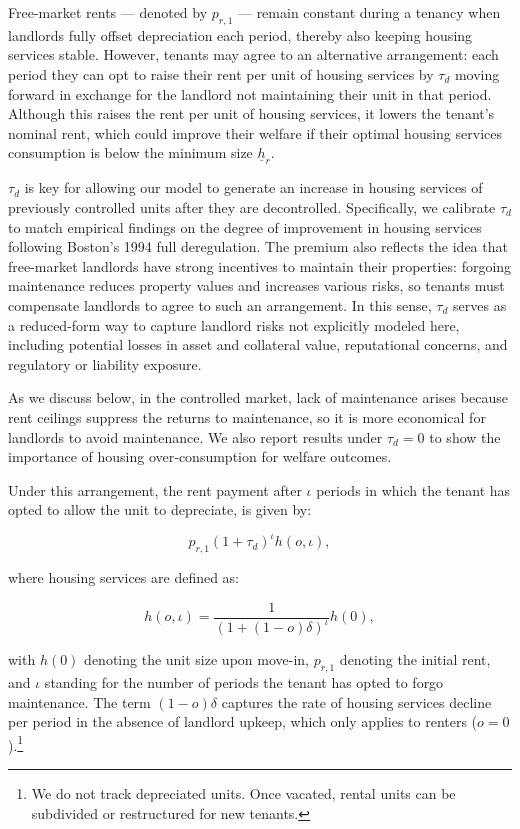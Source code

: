 \documentclass[parskip=full]{article}
\begin{document}
Free-market rents — denoted by $p_{r,1}$ — remain constant during a tenancy when landlords fully offset depreciation each period, thereby also keeping housing services stable. However, tenants may agree to an alternative arrangement: each period they can opt to raise their rent per unit of housing services by $\tau_d$ moving forward in exchange for the landlord not maintaining their unit in that period. Although this raises the rent per unit of housing services, it lowers the tenant’s nominal rent, which could improve their welfare if their optimal housing services consumption is below the minimum size $\underline{h}_r$. 

$\tau_d$ is key for allowing our model to generate an increase in housing services of previously controlled units after they are decontrolled. Specifically, we calibrate $\tau_d$ to match empirical findings on the degree of improvement in housing services following Boston's 1994 full deregulation. The premium also reflects the idea that free-market landlords have strong incentives to maintain their properties: forgoing maintenance reduces property values and increases various risks, so tenants must compensate landlords to agree to such an arrangement. In this sense, $\tau_d$ serves as a reduced-form way to capture landlord risks not explicitly modeled here, including potential losses in asset and collateral value, reputational concerns, and regulatory or liability exposure.

As we discuss below, in the controlled market, lack of maintenance arises because rent ceilings suppress the returns to maintenance, so it is more economical for landlords to avoid maintenance. We also report results under $\tau_d=0$ to show the importance of housing over‑consumption for welfare outcomes.

Under this arrangement, the rent payment after $\iota$ periods in which the tenant has opted to allow the unit to depreciate, is given by:

\begin{equation}\label{eq:rent_in_free_market}
p_{r,1}(1+\tau_d)^{\iota} h(o,\iota),
\end{equation}

\noindent where housing services are defined as:

\begin{equation}\label{eq:housing_services}
h(o,\iota) = \frac{1}{(1 + (1 - o)\delta)^{\iota}} h(0),
\end{equation}

\noindent with $h(0)$ denoting the unit size upon move-in, $p_{r,1}$ denoting the initial rent, and $\iota$ standing for the number of periods the tenant has opted to forgo maintenance. The term $(1 - o)\delta$ captures the rate of housing services decline per period in the absence of landlord upkeep, which only applies to renters ($o = 0$).\footnote{We do not track depreciated units. Once vacated, rental units can be subdivided or restructured for new tenants.}
\end{document}
